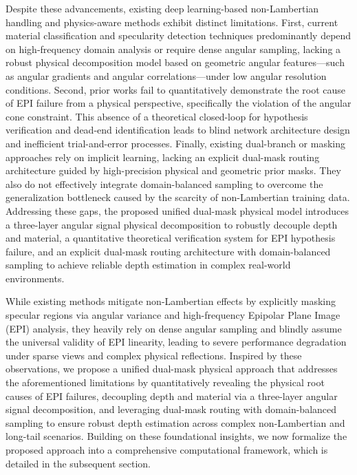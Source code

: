 \documentclass[lettersize,journal]{IEEEtran}
\begin{document}
Despite these advancements, existing deep learning-based non-Lambertian handling and physics-aware methods exhibit distinct limitations. First, current material classification and specularity detection techniques predominantly depend on high-frequency domain analysis or require dense angular sampling, lacking a robust physical decomposition model based on geometric angular features---such as angular gradients and angular correlations---under low angular resolution conditions. Second, prior works fail to quantitatively demonstrate the root cause of EPI failure from a physical perspective, specifically the violation of the angular cone constraint. This absence of a theoretical closed-loop for hypothesis verification and dead-end identification leads to blind network architecture design and inefficient trial-and-error processes. Finally, existing dual-branch or masking approaches rely on implicit learning, lacking an explicit dual-mask routing architecture guided by high-precision physical and geometric prior masks. They also do not effectively integrate domain-balanced sampling to overcome the generalization bottleneck caused by the scarcity of non-Lambertian training data. Addressing these gaps, the proposed unified dual-mask physical model introduces a three-layer angular signal physical decomposition to robustly decouple depth and material, a quantitative theoretical verification system for EPI hypothesis failure, and an explicit dual-mask routing architecture with domain-balanced sampling to achieve reliable depth estimation in complex real-world environments.

While existing methods mitigate non-Lambertian effects by explicitly masking specular regions via angular variance and high-frequency Epipolar Plane Image (EPI) analysis, they heavily rely on dense angular sampling and blindly assume the universal validity of EPI linearity, leading to severe performance degradation under sparse views and complex physical reflections. Inspired by these observations, we propose a unified dual-mask physical approach that addresses the aforementioned limitations by quantitatively revealing the physical root causes of EPI failures, decoupling depth and material via a three-layer angular signal decomposition, and leveraging dual-mask routing with domain-balanced sampling to ensure robust depth estimation across complex non-Lambertian and long-tail scenarios. Building on these foundational insights, we now formalize the proposed approach into a comprehensive computational framework, which is detailed in the subsequent section.
\end{document}
